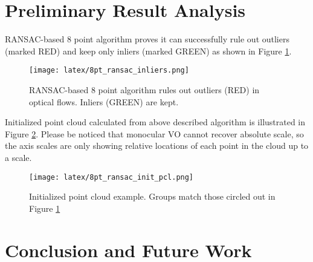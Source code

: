 \documentclass[10pt,twocolumn,letterpaper]{article}
\begin{document}
\section{Preliminary Result Analysis}

RANSAC-based 8 point algorithm proves it can successfully rule out outliers (marked RED) and keep only inliers (marked GREEN) as shown in Figure \ref{fig:figure4}. 

\begin{figure}[h]
\texttt{[image: latex/8pt\_ransac\_inliers.png]}
\caption{RANSAC-based 8 point algorithm rules out outliers (RED) in optical flows. Inliers (GREEN) are kept.}
\label{fig:figure4}
\end{figure}

Initialized point cloud calculated from above described algorithm is illustrated in Figure \ref{fig:figure5}. Please be noticed that monocular VO cannot recover absolute scale, so the axis scales are only showing relative locations of each point in the cloud up to a scale. 

\begin{figure}[h]
\texttt{[image: latex/8pt\_ransac\_init\_pcl.png]}
\caption{Initialized point cloud example. Groups match those circled out in Figure \ref{fig:figure4}}
\label{fig:figure5}
\end{figure}

\section{Conclusion and Future Work}


{\small


}
\end{document}
